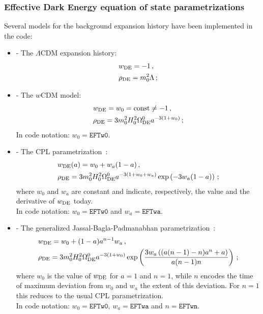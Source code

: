\documentclass[prd,nofootinbib,showpacs]{revtex4}
\begin{document}
{%
\subsubsection{Effective Dark Energy equation of state parametrizations}\label{SubSec:DeEOS}
Several  models for the background expansion history have been implemented in the code:
%
\begin{itemize}
\item[] -  The $\Lambda$CDM expansion history: 
\begin{align}
& w_{\rm DE}=-1 \,,\nonumber \\
& \rho_{\rm DE} = m_0^2 \Lambda \,;
\end{align}
\item[] -  The $w$CDM model:
\begin{align}
& w_{\rm DE} = w_0 = \text{const} \neq -1 \,, \nonumber \\
& \rho_{\rm DE} = 3 m_0^2 H_0^2 \Omega^0_{\rm DE} a^{-3(1+w_0)} \,;
\end{align}
In code notation: $w_0 = \texttt{EFTw0}$.
\item[] -  The CPL parametrization~\cite{Chevallier:2000qy,Linder:2002et}: 
\begin{align}
& w_{\rm DE}(a)=w_0 + w_a(1-a) \,,\nonumber \\
& \rho_{\rm DE} = 3 m_0^2 H_0^2 \Omega^0_{\rm DE} a^{-3(1+w_0+w_a)}\exp\left(-3 w_a (1-a) \right) \,;
\end{align}
where $w_0$ and $w_a$ are constant and indicate, respectively, the value and the derivative of $w_{\rm DE}$ today. \\
In code notation: $w_0 = \texttt{EFTw0}$ and $w_a = \texttt{EFTwa}$.
\item[] - The generalized Jassal-Bagla-Padmanabhan parametrization~\cite{Jassal:2004ej,Jassal:2006gf}:
\begin{align}
& w_{\rm DE} = w_0 +(1-a)a^{n-1} w_a \,, \nonumber \\
& \rho_{\rm DE} = 3 m_0^2 H_0^2 \Omega^0_{\rm DE} a^{-3(1+w_0)}\exp \left(\frac{3 w_a \left((a (n-1)-n) a^n+a\right)}{a (n-1) n}\right) \,;
\end{align}
where $w_0$ is the value of $w_{\rm DE}$ for $a=1$ and $n=1$, while $n$ encodes the time of maximum deviation from $w_0$ and $w_a$ the extent of this deviation. For $n=1$ this reduces to the usual CPL parametrization. \\
In code notation: $w_0 = \texttt{EFTw0}$, $w_a = \texttt{EFTwa}$ and $n = \texttt{EFTwn}$.

\end{itemize}}
\end{document}
